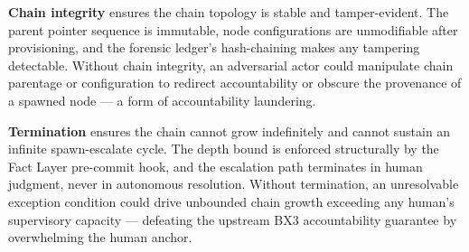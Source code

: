 \medskip
\textbf{Chain integrity} ensures the chain topology is stable and tamper-evident. The parent pointer sequence is immutable, node configurations are unmodifiable after provisioning, and the forensic ledger's hash-chaining makes any tampering detectable. Without chain integrity, an adversarial actor could manipulate chain parentage or configuration to redirect accountability or obscure the provenance of a spawned node — a form of accountability laundering.

\medskip
\textbf{Termination} ensures the chain cannot grow indefinitely and cannot sustain an infinite spawn-escalate cycle. The depth bound is enforced structurally by the Fact Layer pre-commit hook, and the escalation path terminates in human judgment, never in autonomous resolution. Without termination, an unresolvable exception condition could drive unbounded chain growth exceeding any human's supervisory capacity — defeating the upstream BX3 accountability guarantee by overwhelming the human anchor.
